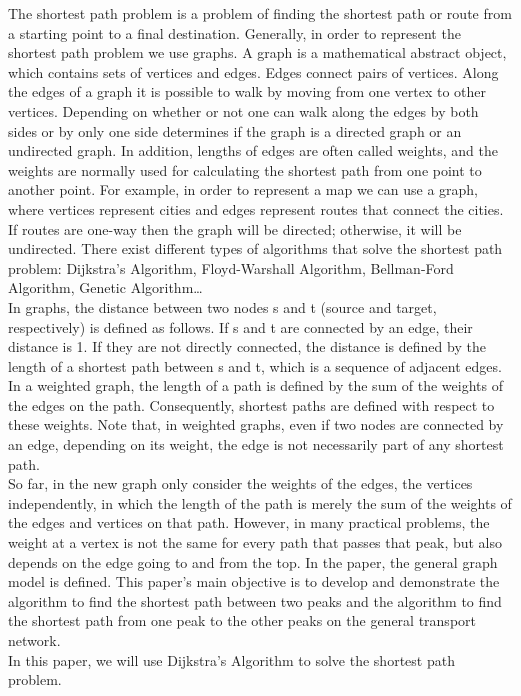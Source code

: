 \documentclass{article}
\begin{document}
The shortest path problem is a problem of finding the shortest path or route from a starting point to a final destination. Generally, in order to represent the shortest path problem we use graphs. A graph is a mathematical abstract object, which contains sets of vertices and edges. Edges connect pairs of vertices. Along the edges of a graph it is possible to walk by moving from one vertex to other vertices. Depending on whether or not one can walk along the edges by both sides or by only one side determines if the graph is a directed graph or an undirected graph. In addition, lengths of edges are often called weights, and the weights are normally used for calculating the shortest path from one point to another point. For example, in order to represent a map we can use a graph, where vertices represent cities and edges represent routes that connect the cities. If routes are one-way then the graph will be directed; otherwise, it will be undirected. There exist different types of algorithms that solve the shortest path problem: Dijkstra’s Algorithm, Floyd-Warshall Algorithm, Bellman-Ford Algorithm, Genetic Algorithm… 
\vspace{5pt}
\\
In graphs, the distance between two nodes s and t (source and target, respectively) is defined as follows. If s and t are connected by an edge, their distance is 1. If they are not directly connected, the distance is defined by the length of a shortest path between s and t, which is a sequence of adjacent edges. In a weighted graph, the length of a path is defined by the sum of the weights of the edges on the path. Consequently, shortest paths are defined with respect to these weights. Note that, in weighted graphs, even if two nodes are connected by an edge, depending on its weight, the edge is not necessarily part of any shortest path.
\vspace{5pt}
\\
So far, in the new graph only consider the weights of the edges, the vertices independently, in which the length of the path is merely the sum of the weights of the edges and vertices on that path. However, in many practical problems, the weight at a vertex is not the same for every path that passes that peak, but also depends on the edge going to and from the top. In the paper, the general graph model is defined. This paper’s main objective is to develop and demonstrate the algorithm to find the shortest path between two peaks and the algorithm to find the shortest path from one peak to the other peaks on the general transport network.
\vspace{5pt}
\\
In this paper, we will use Dijkstra’s Algorithm to solve the shortest path problem.
\end{document}
